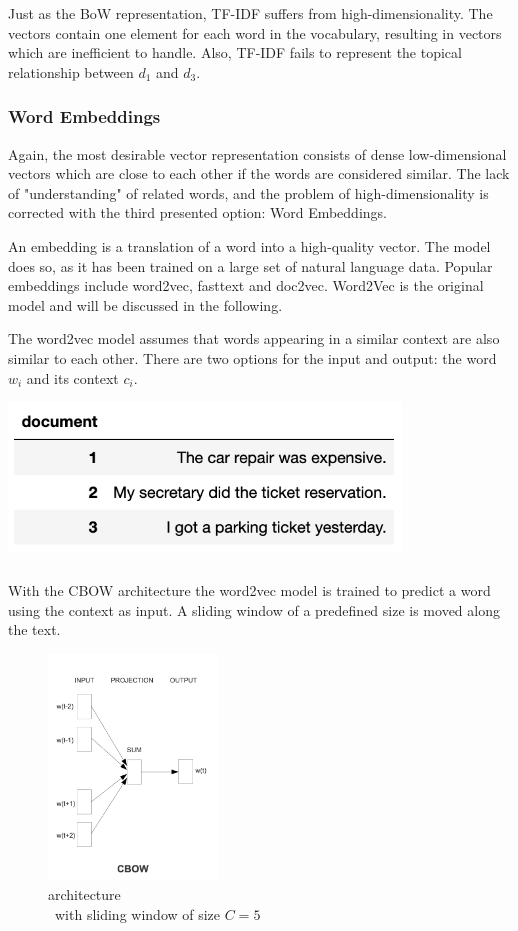 		Just as the \ac{BoW} representation, \ac{TF-IDF} suffers from high-dimensionality. The vectors contain one element for each word in the vocabulary, resulting in vectors which are inefficient to handle.
		Also, \ac{TF-IDF} fails to represent the topical relationship between $ d_{1} $ and $ d_{3}$. 
		
		\subsubsection{Word Embeddings}
		 Again, the most desirable vector representation consists of dense low-dimensional vectors which are close to each other if the words are considered similar. The lack of "understanding" of related words, and the problem of high-dimensionality is corrected with the third presented option: Word Embeddings.
		
		An embedding is a translation of a word into a high-quality vector. The model does so, as it has been trained on a large set of natural language data. Popular embeddings include word2vec, fasttext and doc2vec. Word2Vec is the original model and will be discussed in the following. 
		
		The word2vec model assumes that words appearing in a similar context are also similar to each other. There are two options for the input and output: the word $w_i$ and its context $c_i$.
		
		\includegraphics[height=4cm]{Bilder/word2vec/documents.png}
		
		\subparagraph{} 
		With the \ac{CBOW} architecture the word2vec model is trained to predict a word using the context as input. A sliding window of a predefined size is moved along the text. 
		
		\begin{figure}[ht]
			\centering
			\includegraphics[height=6cm]{Bilder/word2vec/architecture_cbow.png}
			\caption{ architecture\\\ with sliding window of size $C=5$ }
			\label{fig:cbow-architecture}
		\end{figure}
	
